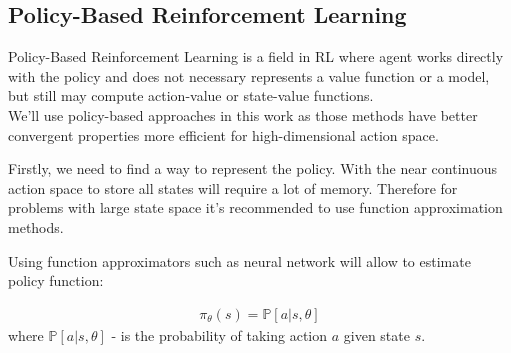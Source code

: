 










\subsection{Policy-Based Reinforcement Learning}
\label{ss:pol_based_rl}
Policy-Based Reinforcement Learning is a field in RL where agent works directly
with the policy and does not necessary represents a value function or a model,
but still may compute action-value or state-value functions.\\
We'll use policy-based approaches in this work as those methods have better
convergent properties more efficient for high-dimensional action space.
\cite{DBLP:journals/corr/MnihHGK14}


Firstly, we need to find a way to represent the policy. With the near continuous
action space to store
all states will require a lot of memory. Therefore for problems with large
state space it's recommended to use function approximation methods.

Using function approximators such as neural network will allow to
estimate policy function:

\begin{align} \label{eq:policy_appr_func}
	\pi_{\theta}(s) = \mathbb{P}[a|s, \theta]
\end{align}
where $\mathbb{P}[a|s, \theta]$ - is the probability of taking action $a$
given state $s$.

